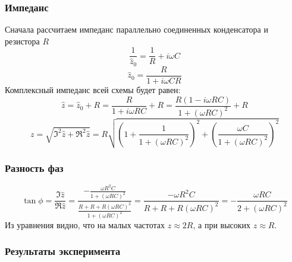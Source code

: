 \subsubsection{Импеданс}
Сначала рассчитаем импеданс параллельно соединенных конденсатора и резистора $R$
\begin{equation}
	\frac{1}{\hat{z}_0}=\frac{1}{R}+i\omega C
\end{equation}
\begin{equation}
	\hat{z}_0=\frac{R}{1+i \omega CR}
\end{equation}
Комплексный импеданс всей схемы будет равен:
\begin{equation}
	\hat{z}=\hat{z}_0+R=\frac{R}{1+i \omega RC}+R=
	\frac{R(1-i \omega RC)}{1+(\omega RC)^2}+R
\end{equation}
\begin{equation}
	z=\sqrt{\Im^2\hat{z}+\Re^2\hat{z}}=
	R\sqrt{
	\left(
	1+\frac{1}{1+(\omega RC)^2}
	\right)^2+
	\left(
	\frac{\omega C}{1+(\omega RC)^2}
	\right)^2
	}
\end{equation}

\subsubsection{Разность фаз}
\begin{equation}
	\tan\phi = \frac{\Im\hat{z}}{\Re\hat{z}}=
	\frac{
		-\frac{\omega R^2C}{1+(\omega RC)^2}
	}{
		\frac{R+R+R(\omega RC)^2}{1+(\omega RC)^2}
	}=
	\frac{
		-\omega R^2C
	}{
		R+R+R(\omega RC)^2
	}=
	-\frac{
		\omega RC
	}{
		2+(\omega RC)^2
	}	
\end{equation}
Из уравнения видно, что на малых частотах $z\approx 2R$, а при высоких $z\approx R$.

\subsubsection{Результаты эксперимента}

